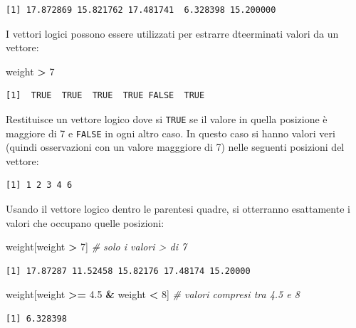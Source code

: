 \documentclass[
  a4paper,
  DIV=11,
  numbers=noendperiod]{scrreprt}
\newenvironment{Shaded}{\begin{snugshade}}{\end{snugshade}}
\newcommand{\CommentTok}[1]{\textcolor[rgb]{0.56,0.35,0.01}{\textit{#1}}}
\newcommand{\DecValTok}[1]{\textcolor[rgb]{0.00,0.00,0.81}{#1}}
\newcommand{\FloatTok}[1]{\textcolor[rgb]{0.00,0.00,0.81}{#1}}
\newcommand{\NormalTok}[1]{#1}
\newcommand{\SpecialCharTok}[1]{\textcolor[rgb]{0.81,0.36,0.00}{\textbf{#1}}}
\begin{document}
\begin{verbatim}
[1] 17.872869 15.821762 17.481741  6.328398 15.200000
\end{verbatim}

I vettori logici possono essere utilizzati per estrarre dteerminati
valori da un vettore:

\begin{Shaded}
\begin{Highlighting}[]
\NormalTok{weight }\SpecialCharTok{\textgreater{}} \DecValTok{7} 
\end{Highlighting}
\end{Shaded}

\begin{verbatim}
[1]  TRUE  TRUE  TRUE  TRUE FALSE  TRUE
\end{verbatim}

Restituisce un vettore logico dove si \texttt{TRUE} se il valore in
quella posizione è maggiore di 7 e \texttt{FALSE} in ogni altro caso. In
questo caso si hanno valori veri (quindi osservazioni con un valore
magggiore di 7) nelle seguenti posizioni del vettore:

\begin{verbatim}
[1] 1 2 3 4 6
\end{verbatim}

Usando il vettore logico dentro le parentesi quadre, si otterranno
esattamente i valori che occupano quelle posizioni:

\begin{Shaded}
\begin{Highlighting}[]
\NormalTok{weight[weight }\SpecialCharTok{\textgreater{}} \DecValTok{7}\NormalTok{] }\CommentTok{\# solo i valori \textgreater{} di 7}
\end{Highlighting}
\end{Shaded}

\begin{verbatim}
[1] 17.87287 11.52458 15.82176 17.48174 15.20000
\end{verbatim}

\begin{Shaded}
\begin{Highlighting}[]
\NormalTok{weight[weight }\SpecialCharTok{\textgreater{}=} \FloatTok{4.5} \SpecialCharTok{\&}\NormalTok{ weight }\SpecialCharTok{\textless{}} \DecValTok{8}\NormalTok{] }\CommentTok{\# valori compresi tra 4.5 e 8}
\end{Highlighting}
\end{Shaded}

\begin{verbatim}
[1] 6.328398
\end{verbatim}
\end{document}
